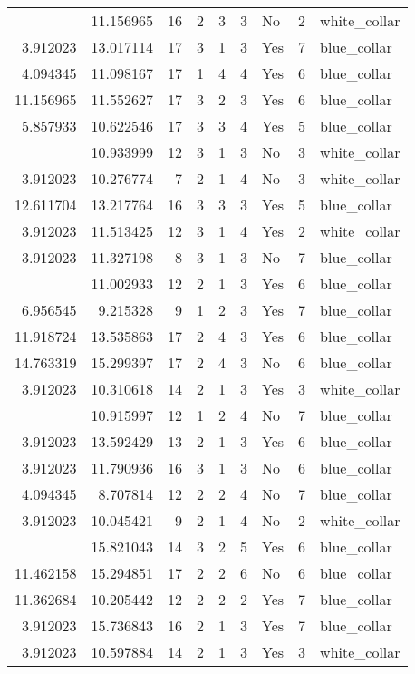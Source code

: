 \documentclass[
]{article}
\begin{document}
\begin{longtable}[t]{rrrrrllrl}
\addlinespace
8.621553 & 11.156965 & 16 & 2 & 3 & 3 & No & 2 & white\_collar\\
3.912023 & 13.017114 & 17 & 3 & 1 & 3 & Yes & 7 & blue\_collar\\
4.094345 & 11.098167 & 17 & 1 & 4 & 4 & Yes & 6 & blue\_collar\\
11.156965 & 11.552627 & 17 & 3 & 2 & 3 & Yes & 6 & blue\_collar\\
5.857933 & 10.622546 & 17 & 3 & 3 & 4 & Yes & 5 & blue\_collar\\
\addlinespace
3.912023 & 10.933999 & 12 & 3 & 1 & 3 & No & 3 & white\_collar\\
3.912023 & 10.276774 & 7 & 2 & 1 & 4 & No & 3 & white\_collar\\
12.611704 & 13.217764 & 16 & 3 & 3 & 3 & Yes & 5 & blue\_collar\\
3.912023 & 11.513425 & 12 & 3 & 1 & 4 & Yes & 2 & white\_collar\\
3.912023 & 11.327198 & 8 & 3 & 1 & 3 & No & 7 & blue\_collar\\
\addlinespace
3.912023 & 11.002933 & 12 & 2 & 1 & 3 & Yes & 6 & blue\_collar\\
6.956545 & 9.215328 & 9 & 1 & 2 & 3 & Yes & 7 & blue\_collar\\
11.918724 & 13.535863 & 17 & 2 & 4 & 3 & Yes & 6 & blue\_collar\\
14.763319 & 15.299397 & 17 & 2 & 4 & 3 & No & 6 & blue\_collar\\
3.912023 & 10.310618 & 14 & 2 & 1 & 3 & Yes & 3 & white\_collar\\
\addlinespace
6.745236 & 10.915997 & 12 & 1 & 2 & 4 & No & 7 & blue\_collar\\
3.912023 & 13.592429 & 13 & 2 & 1 & 3 & Yes & 6 & blue\_collar\\
3.912023 & 11.790936 & 16 & 3 & 1 & 3 & No & 6 & blue\_collar\\
4.094345 & 8.707814 & 12 & 2 & 2 & 4 & No & 7 & blue\_collar\\
3.912023 & 10.045421 & 9 & 2 & 1 & 4 & No & 2 & white\_collar\\
\addlinespace
10.128629 & 15.821043 & 14 & 3 & 2 & 5 & Yes & 6 & blue\_collar\\
11.462158 & 15.294851 & 17 & 2 & 2 & 6 & No & 6 & blue\_collar\\
11.362684 & 10.205442 & 12 & 2 & 2 & 2 & Yes & 7 & blue\_collar\\
3.912023 & 15.736843 & 16 & 2 & 1 & 3 & Yes & 7 & blue\_collar\\
3.912023 & 10.597884 & 14 & 2 & 1 & 3 & Yes & 3 & white\_collar\\

\end{longtable}
\end{document}
